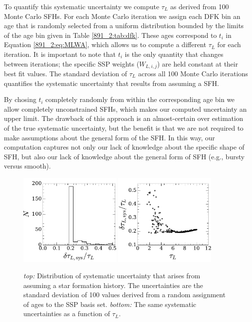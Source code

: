 To quantify this systematic uncertainty we compute $\tau_L$ as derived
from 100 Monte Carlo SFHs. For each Monte Carlo iteration we assign
each DFK bin an age that is randomly selected from a uniform
distribution bounded by the limits of the age bin given in Table
\ref{891_2:tab:dfk}. These ages correspond to $t_i$ in Equation
\ref{891_2:eq:MLWA}, which allows us to compute a different $\tau_L$ for
each iteration. It is important to note that $t_i$ is the only
quantity that changes between iterations; the specific SSP weights
($W_{L,i,j}$) are held constant at their best fit values. The standard
deviation of $\tau_L$ across all 100 Monte Carlo iterations quantifies
the systematic uncertainty that results from assuming a SFH.

By chosing $t_i$ completely randomly from within the corresponding age
bin we allow completely unconstrained SFHs, which makes our computed
uncertainty an upper limit. The drawback of this approach is an
almost-certain over estimation of the true systematic uncertainty, but
the benefit is that we are not required to make assumptions about the
general form of the SFH. In this way, our computation
captures not only our lack of knowledge about the specific shape of
SFH, but also our lack of knowledge about the general form of SFH
(e.g., bursty versus smooth).

\begin{figure}
  \centering
  \includegraphics[width=0.45\textwidth]{891_2/figs/sys_uncertainty_hist.pdf}
  \includegraphics[width=0.45\textwidth]{891_2/figs/sys_uncertainty.pdf}
  \caption[Distribution of systematic uncertainties in
    $\tau_L$]{\fixspacing\label{891_2:fig:sys_err}\emph{top:}
    Distribution of systematic uncertainty that arises from assuming a
    star formation history. The uncertainties are the standard
    deviation of 100 values derived from a random assignment of ages
    to the SSP basis set. \emph{bottom:} The same systematic
    uncertainties as a function of $\tau_L$.}
\end{figure}


